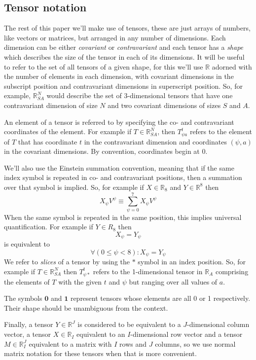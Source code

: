 \documentclass{article}
\begin{document}
\subsection{Tensor notation}

The rest of this paper we'll make use of tensors, these are just arrays of numbers, like vectors or matrices, but arranged in any number of dimensions. Each dimension can be either \textit{covariant} or \textit{contravariant} and each tensor has a \textit{shape} which describes the size of the tensor in each of its dimensions. It will be useful to refer to the set of all tensors of a given shape, for this we'll use $\mathbb{R}$ adorned with the number of elements in each dimension, with covariant dimensions in the subscript position and contravariant dimensions in superscript position. So, for example, $\mathbb{R}^N_{SA}$ would describe the set of 3-dimensional tensors that have one contravariant dimension of size $N$ and two covariant dimensions of sizes $S$ and $A$.

An element of a tensor is referred to by specifying the co- and contravariant coordinates of the element. For example if $T \in \mathbb{R}^N_{SA}$, then $T^t_{\psi a}$ refers to the element of $T$ that has coordinate $t$ in the contravariant dimension and coordinates $(\psi,a)$ in the covariant dimensions. By convention, coordinates begin at 0.

We'll also use the Einstein summation convention, meaning that if the same index symbol is repeated in co- and contravariant positions, then a summation over that symbol is implied. So, for example if $X \in \mathbb{R}_8$ and $Y \in \mathbb{R}^8$ then
\[
X_\psi V^\psi \equiv \sum_{\psi=0}^7 X_\psi  V^\psi
\]
When the same symbol is repeated in the same position, this implies universal quantification. For example if $Y\in R_8$ then
\[
X_\psi = Y_\psi 
\]
is equivalent to
\[
\forall (0 \le \psi < 8) : X_\psi = Y_\psi 
\]
We refer to \textit{slices} of a tensor by using the $*$ symbol in an index position. So, for example if $T \in \mathbb{R}^N_{SA}$ then $T^t_{\psi *}$ refers to the 1-dimensional tensor in $\mathbb{R}_A$ comprising the elements of $T$ with the given $t$ and $\psi$ but ranging over all values of $a$.

The symbols $\mathbf{0}$ and $\mathbf{1}$ represent tensors whose elements are all 0 or 1 respectively. Their shape should be unambiguous from the context.

Finally, a tensor $Y\in \mathbb{R}^J$ is considered to be equivalent to a $J$-dimensional column vector, a tensor  $X\in \mathbb{R}_I$ equivalent to an $I$-dimensional row vector and a tensor $M \in \mathbb{R}^J_I$ equivalent to a matrix with  $I$ rows and $J$ columns, so we use normal matrix notation for these tensors when that is more convenient.
\end{document}
